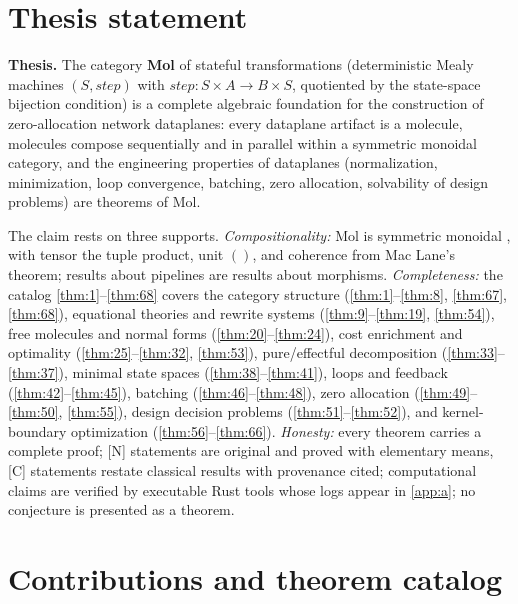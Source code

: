 \section{Thesis statement}
\label{sec:thesis-statement}

\textbf{Thesis.} The category \textbf{Mol} of stateful transformations (deterministic Mealy machines $(S, \mathit{step})$ with $\mathit{step} : S \times A \to B \times S$, quotiented by the state-space bijection condition) is a complete algebraic foundation for the construction of zero-allocation network dataplanes: every dataplane artifact is a molecule, molecules compose sequentially and in parallel within a symmetric monoidal category, and the engineering properties of dataplanes (normalization, minimization, loop convergence, batching, zero allocation, solvability of design problems) are theorems of Mol.

The claim rests on three supports. \emph{Compositionality:} Mol is symmetric monoidal \citep{maclane}, with tensor the tuple product, unit $()$, and coherence from Mac Lane's theorem; results about pipelines are results about morphisms. \emph{Completeness:} the catalog \autoref{thm:1}--\autoref{thm:68} covers the category structure (\autoref{thm:1}--\autoref{thm:8}, \autoref{thm:67}, \autoref{thm:68}), equational theories and rewrite systems (\autoref{thm:9}--\autoref{thm:19}, \autoref{thm:54}), free molecules and normal forms (\autoref{thm:20}--\autoref{thm:24}), cost enrichment and optimality (\autoref{thm:25}--\autoref{thm:32}, \autoref{thm:53}), pure/effectful decomposition (\autoref{thm:33}--\autoref{thm:37}), minimal state spaces (\autoref{thm:38}--\autoref{thm:41}), loops and feedback (\autoref{thm:42}--\autoref{thm:45}), batching (\autoref{thm:46}--\autoref{thm:48}), zero allocation (\autoref{thm:49}--\autoref{thm:50}, \autoref{thm:55}), design decision problems (\autoref{thm:51}--\autoref{thm:52}), and kernel-boundary optimization (\autoref{thm:56}--\autoref{thm:66}). \emph{Honesty:} every theorem carries a complete proof; [N] statements are original and proved with elementary means, [C] statements restate classical results with provenance cited; computational claims are verified by executable Rust tools whose logs appear in \autoref{app:a}; no conjecture is presented as a theorem.

\section{Contributions and theorem catalog}
\label{sec:contributions}

